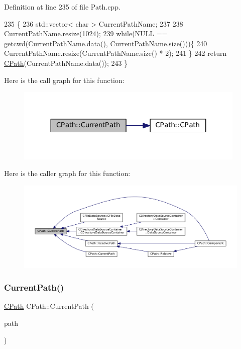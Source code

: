 Definition at line 235 of file Path.\+cpp.


\begin{DoxyCode}
235                         \{
236     std::vector< char > CurrentPathName;
237 
238     CurrentPathName.resize(1024);
239     \textcolor{keywordflow}{while}(NULL == getcwd(CurrentPathName.data(), CurrentPathName.size()))\{
240         CurrentPathName.resize(CurrentPathName.size() * 2);
241     \}
242     \textcolor{keywordflow}{return} \hyperlink{classCPath_a26b6e34c8019d440136848f809c13897}{CPath}(CurrentPathName.data());
243 \}
\end{DoxyCode}
Here is the call graph for this function\+:\nopagebreak
\begin{figure}[H]
\begin{center}
\leavevmode
\includegraphics[width=311pt]{classCPath_a5161b834e754b217ddead2437eaaa223_cgraph}
\end{center}
\end{figure}
Here is the caller graph for this function\+:\nopagebreak
\begin{figure}[H]
\begin{center}
\leavevmode
\includegraphics[width=350pt]{classCPath_a5161b834e754b217ddead2437eaaa223_icgraph}
\end{center}
\end{figure}
\hypertarget{classCPath_a87ec01e5af0eb4e2184caf1d9ecc8892}{}\label{classCPath_a87ec01e5af0eb4e2184caf1d9ecc8892} 
\subsubsection{\texorpdfstring{Current\+Path()}{CurrentPath()}\hspace{0.1cm}{\footnotesize\ttfamily [2/2]}}
{\footnotesize\ttfamily \hyperlink{classCPath}{C\+Path} C\+Path\+::\+Current\+Path (\begin{DoxyParamCaption}\item[{const \hyperlink{classCPath}{C\+Path} \&}]{path }\end{DoxyParamCaption})\hspace{0.3cm}{\ttfamily [static]}}



